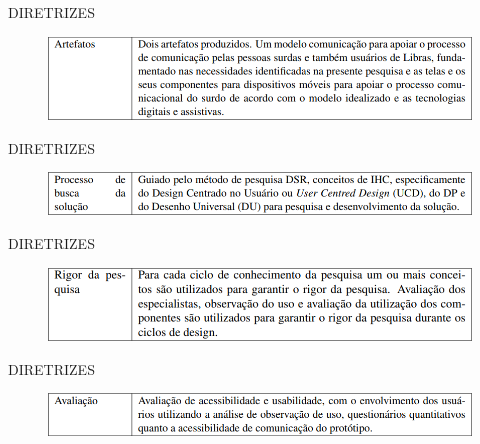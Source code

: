 \documentclass{Alexandre}
\begin{document}
\begin{frame}{DIRETRIZES}
    
    \begin{figure}
        \includegraphics[scale = 0.5]{Figuras/DSR-2.png}
    \end{figure}

\end{frame}


\begin{frame}{DIRETRIZES}
    
    \begin{figure}
        \includegraphics[scale = 0.5]{Figuras/DSR-3.png}
    \end{figure}

\end{frame}


\begin{frame}{DIRETRIZES}
    
    \begin{figure}
        \includegraphics[scale = 0.5]{Figuras/DSR-4.png}
    \end{figure}

\end{frame}


\begin{frame}{DIRETRIZES}
    
    \begin{figure}
        \includegraphics[scale = 0.5]{Figuras/DSR-5.png}
    \end{figure}

\end{frame}
\end{document}
